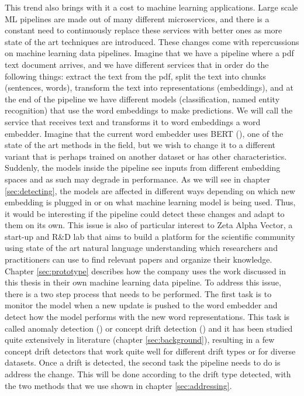 \documentclass[12pt]{extreport}
\begin{document}
This trend also brings with it a cost to machine learning applications. Large scale ML pipelines are made out of many different microservices, and there is a constant need to continuously replace these services with better ones as more state of the art techniques are introduced. These changes come with repercussions on machine learning data pipelines. Imagine that we have a pipeline where a pdf text document arrives, and we have different services that in order do the following things: extract the text from the pdf, split the text into chunks (sentences, words), transform the text into representations (embeddings), and at the end of the pipeline we have different models (classification, named entity recognition) that use the word embeddings to make predictions. We will call the service that receives text and transforms it to word embeddings a word embedder. Imagine that the current word embedder uses BERT (\cite{bert}), one of the state of the art methods in the field, but we wish to change it to a different variant that is perhaps trained on another dataset or has other characteristics. Suddenly, the models inside the pipeline see inputs from different embedding spaces and as such may degrade in performance. As we will see in chapter \ref{sec:detecting}, the models are affected in different ways depending on which new embedding is plugged in or on what machine learning model is being used. Thus, it would be interesting if the pipeline could detect these changes and adapt to them on its own. This issue is also of particular interest to Zeta Alpha Vector, a start-up and R\&D lab that aims to build a platform for the scientific community using state of the art natural language understanding which researchers and practitioners can use to find relevant papers and organize their knowledge. Chapter \ref{sec:prototype} describes how the company uses the work discussed in this thesis in their own machine learning data pipeline. To address this issue, there is a two step process that needs to be performed. The first task is to monitor the model when a new update is pushed to the word embedder and detect how the model performs with the new word representations. This task is called anomaly detection (\cite{anomaly-detection}) or concept drift detection (\cite{survey-concept-drift}) and it has been studied quite extensively in literature (chapter \ref{sec:background}), resulting in a few concept drift detectors that work quite well for different drift types or for diverse datasets. Once a drift is detected, the second task the pipeline needs to do is address the change. This will be done according to the drift type detected, with the two methods that we use shown in chapter \ref{sec:addressing}.
\end{document}
